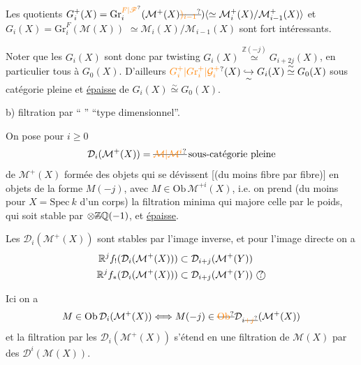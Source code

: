 Les quotients $G_i^+(X)=\mathrm{Gr}^{\unsure{F|\mathscr F}}_i(\mathcal M^+(X)\deleted{\unsure{)_{i-1}}})\inserted{\simeq\mathcal M_i^+(X)/\mathcal M_{i-1}^+(X)}$ et $G_i(X)=\mathrm{Gr}^{F}_i(\mathcal M(X))$ %
$\simeq\mathcal M_i(X)/\mathcal M_{i-1}(X)$ sont fort intéressants. %

Noter que les $G_i(X)$ sont donc   %
par twisting $G_i(X)\overset{\mathbb Z(-j)}{\simeq}G_{i+2j}(X)$, en %
particulier tous   à $G_0(X)$. %
D'ailleurs $\unsure{G_i^+|G\mathrm r_i^+|\mathcal G_i^+}(X)\underset{\sim}{\hookrightarrow}G_i(X)\overset{\sim}{\simeq}G_0(X)$ %
 sous catégorie pleine et \uline{épaisse} de $G_i(X)\overset{\sim}{\simeq} %
G_0(X)$. %

b) filtration par `` '' ``type dimensionnel''. %

On pose pour $i\geq 0$ %
\[\mathcal D_i(\mathcal M^+(X))=\deleted{\unsure{\mathcal M|\mathcal M^i}}\,\text{sous-catégorie pleine}\] %
de $\mathcal M^+(X)$ formée des objets %
qui se  dévissent [(du moins %
fibre par fibre)] en objets %
de la forme %
 $M(-j)$, avec $M\in\mathrm{Ob}\,\mathcal M^{+i}(X)$, %
i.e. on prend (du moins pour $X=\mathrm{Spec}\ k$ d'un %
corps) la filtration minima qui %
majore celle par le poids,  qui soit %
stable par $\otimes\deleted{\mathbb Z}\mathbb Q(-1)$, et \uline{épaisse}. %

Les $\mathcal D_i(\mathcal M^+(X))$ sont stables par l'image inverse, %
et pour l'image directe on a %
\[\begin{aligned}\mathbb R^j f_!(\mathcal D_i(\mathcal M^+(X)))&\subset\mathcal D_{i+j}(\mathcal M^+(Y))\\ %
\mathbb R^j f_*(\mathcal D_i(\mathcal M^+(X)))&\subset\mathcal D_{i+j}(\mathcal M^+(Y))\ \text{\textcircled{?}}\end{aligned}\] %

Ici  on a %
\[M\in\mathrm{Ob}\,\mathcal D_i(\mathcal M^+(X))\Longleftrightarrow M(-j)\in\deleted{\unsure{\mathrm{Ob}}}\mathcal D_{i\deleted{\unsure{+j}}}(\mathcal M^+(X))\] %
et la filtration  par les $\mathcal D_i(\mathcal M^+(X))$ s'étend %
en une filtration de $\mathcal M(X)$ par des $\mathcal D^i(\mathcal M(X))$. %

